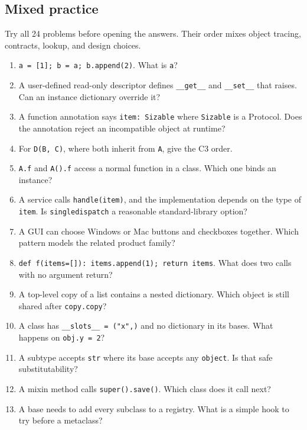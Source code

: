 \documentclass[11pt]{article}
\begin{document}
\clearpage

\begin{keepsection}
\section{Mixed practice}

Try all 24 problems before opening the answers. Their order mixes object tracing, contracts, lookup, and design choices.

\begin{enumerate}
\item \texttt{a = [1]; b = a; b.append(2)}. What is \texttt{a}?
\item A user-defined read-only descriptor defines \texttt{\_\_get\_\_} and \texttt{\_\_set\_\_} that raises. Can an instance dictionary override it?
\item A function annotation says \texttt{item: Sizable} where \texttt{Sizable} is a Protocol. Does the annotation reject an incompatible object at runtime?
\item For \texttt{D(B, C)}, where both inherit from \texttt{A}, give the C3 order.
\item \texttt{A.f} and \texttt{A().f} access a normal function in a class. Which one binds an instance?
\item A service calls \texttt{handle(item)}, and the implementation depends on the type of \texttt{item}. Is \texttt{singledispatch} a reasonable standard-library option?
\item A GUI can choose Windows or Mac buttons and checkboxes together. Which pattern models the related product family?
\item \texttt{def f(items=[]): items.append(1); return items}. What does two calls with no argument return?
\item A top-level copy of a list contains a nested dictionary. Which object is still shared after \texttt{copy.copy}?
\item A class has \texttt{\_\_slots\_\_ = ("x",)} and no dictionary in its bases. What happens on \texttt{obj.y = 2}?
\item A subtype accepts \texttt{str} where its base accepts any \texttt{object}. Is that safe substitutability?
\item A mixin method calls \texttt{super().save()}. Which class does it call next?
\item A base needs to add every subclass to a registry. What is a simple hook to try before a metaclass?

\end{enumerate}
\end{keepsection}
\end{document}
